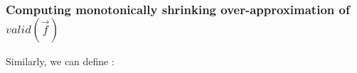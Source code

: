 \documentclass[runningheads,a4paper,orivec]{llncs}
\begin{document}
\subsubsection{Computing monotonically shrinking over-approximation of $valid(\vec{f})$}\label{subsub_loop}
Similarly,
we can define :
% 
% 
\end{document}
